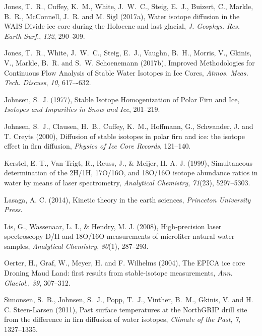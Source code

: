 \documentclass[draft, jgrga]{AGUTeX}
\begin{document}
\begin{article}
\begin{thebibliography}{}
Jones, T.~R., Cuffey, K.~M., White, J.~W.~C., Steig, E.~J., Buizert, C.,
Markle, B.~R., McConnell, J.~R. and M. Sigl (2017a),
{Water isotope diffusion in the WAIS Divide ice core
	during the Holocene and last glacial},
\textit{J. Geophys. Res. Earth Surf.}, \textit{122}, 290–309.

Jones, T.~R., White, J.~W.~C., Steig, E.~J., Vaughn, B.~H., Morris, V.,
Gkinis, V., Markle, B.~R. and S.~W. Schoenemann (2017b),
{Improved Methodologies for Continuous Flow Analysis of Stable
Water Isotopes in Ice Cores},
\textit{Atmos. Meas. Tech. Discuss}, \textit{10}, 617–-632.

Johnsen, S.~J. (1977),
{Stable Isotope Homogenization of Polar Firn and Ice},
\textit{Isotopes and Impurities in Snow and Ice}, 201--219.

Johnsen, S.~J., Clausen, H.~B., Cuffey, K.~M., Hoffmann, G., Schwander, J. and T. Creyts (2000),
{Diffusion of stable isotopes in polar firn and ice: the isotope effect in firn diffusion},
\textit{Physics of Ice Core Records}, 121--140.

Kerstel, E. T., Van Trigt, R., Reuss, J., \& Meijer, H. A. J. (1999),
{Simultaneous determination of the 2H/1H, 17O/16O, and 18O/16O isotope abundance ratios in water by means of laser spectrometry},
\textit{Analytical Chemistry}, \textit{71}(23), 5297--5303.

Lasaga, A. C. (2014),
{Kinetic theory in the earth sciences},
\textit{Princeton University Press}.

Lis, G., Wassenaar, L. I., \& Hendry, M. J. (2008),
{High-precision laser spectroscopy D/H and 18O/16O measurements of microliter natural water samples},
\textit{Analytical Chemistry}, \textit{80}(1), 287--293.

Oerter, H., Graf, W., Meyer, H. and F. Wilhelms (2004),
{The EPICA ice core Droning Maud Land: first results from stable-isotope measurements},
\textit{Ann. Glaciol.}, \textit{39}, 307--312.

Simonsen, S.~B., Johnsen, S.~J., Popp, T.~J., Vinther, B.~M., Gkinis, V. and H. C. Steen-Larsen (2011),
{Past surface temperatures at the NorthGRIP drill site from the difference in firn diffusion of water isotopes},
\textit{Climate of the Past}, \textit{7}, 1327--1335.


\end{thebibliography}
\end{article}
\end{document}
